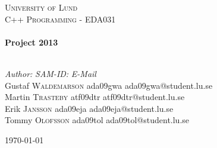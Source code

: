 \begin{titlepage}

\begin{center}

\textsc{\LARGE University of Lund}\\[1.5cm]

%    

\textsc{\Large C++ Programming - EDA031}\\[0.5cm]
\HRule \\[0.4cm]
{ \huge \bfseries Project 2013}\\[0.4cm]

\HRule \\[1.5cm]


\begin{minipage}{0.4\textwidth}
\begin{flushleft} \large
\begin{tabbing}
\emph{Author:} \hspace{30mm} \= \emph{SAM-ID:} \hspace{20mm} \= \emph{E-Mail}\\
Gustaf \textsc{Waldemarson} \> ada09gwa \> ada09gwa@student.lu.se\\
Martin \textsc{Trasteby} \> atf09dtr \> atf09dtr@student.lu.se\\
Erik \textsc{Jansson} \> ada09eja \> ada09eja@student.lu.se\\
Tommy \textsc{Olofsson} \> ada09tol \> ada09tol@student.lu.se\\
\end{tabbing}



\end{flushleft}
\end{minipage}

\vfill

{\large \today}

\end{center}

\end{titlepage}
